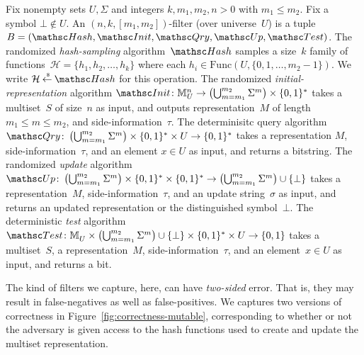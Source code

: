 Fix nonempty sets $U,\Sigma$ and integers $k,m_1,m_2,n>0$ with $m_1 \leq m_2$.  Fix a symbol $\bot \not\in U$.  An $(n,k,[m_1,m_2])$-filter (over universe~$U$) is a tuple  $B=(\Hash,\Init,\Qry,\Update, \Test)$.   
%
The randomized \emph{hash-sampling} algorithm~$\Hash$ samples a size~$k$ family of functions~$\mathcal{H}=\{h_1,h_2,\ldots,h_k\}$ where each $h_i \in  \mathrm{Func}(U,\{0,1,\ldots,m_2-1\})$.  We write $\mathcal{H} \getsr \Hash$ for this operation. 
%
The randomized \emph{initial-representation} algorithm $\Init\colon \multiset{U}{n} \rightarrow \left(\bigcup_{m=m_1}^{m_2}\Sigma^m\right) \times \bits^*$ takes a multiset~$S$ of size~$n$ as input, and outputs representation~$M$ of length~$m_1 \leq m \leq m_2$, and side-information~$\tau$.
%
The determinisitc query algorithm $\Qry\colon \left(\bigcup_{m=m_1}^{m_2}\Sigma^m \right)\times \bits^* \times U \rightarrow \bits^*$ takes a representation $M$, side-information~$\tau$, and an element $x \in U$ as input, and returns a bitstring.  
%
The randomized \emph{update} algorithm $\Update\colon \left(\bigcup_{m=m_1}^{m_2}\Sigma^m \right)\times \bits^* \times \bits^*\rightarrow \left(\bigcup_{m=m_1}^{m_2}\Sigma^m \right) \cup \{\bot\}$ takes a representation~$M$, side-information~$\tau$, and an update string~$\sigma$ as input, and returns an updated representation or the distinguished symbol~$\bot$.  
%
The deterministic \emph{test} algorithm $\Test \colon \multiset{U}{} \times \left(\bigcup_{m=m_1}^{m_2}\Sigma^m \right)\cup\{\bot\} \times \bits^* \times U \rightarrow \bits$ takes a multiset~$S$, a representation~$M$, side-information~$\tau$, and an element~$x \in U$ as input, and returns a bit. 
%

 The kind of filters we capture, here, can have \emph{two-sided} error.  That is, they may result in false-negatives as well as false-positives.  We captures two versions of correctness in Figure~\ref{fig:correctness-mutable}, corresponding to whether or not the adversary is given access to the hash functions used to create and update the multiset representation. 

